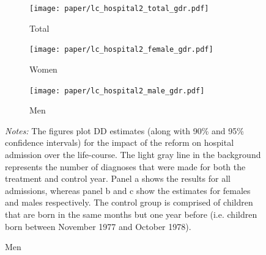 \documentclass[11pt, a4paper,draft]{article} %
\begin{document}





\newpage
\vspace*{\fill}
\begin{figure}[H]\centering
	\caption{Life-course approach}\label{fig: lc_hospital2_gdr_DD}
	\begin{subfigure}[h]{0.48\linewidth}\centering\caption{Total}
		\texttt{[image: paper/lc\_hospital2\_total\_gdr.pdf]}
	\end{subfigure}
	
	
	\begin{subfigure}[h]{0.48\linewidth}\centering\caption{Women}
		\texttt{[image: paper/lc\_hospital2\_female\_gdr.pdf]}
	\end{subfigure}
	\quad
	\begin{subfigure}[h]{0.48\linewidth}\centering\caption{Men}
		\texttt{[image: paper/lc\_hospital2\_male\_gdr.pdf]}
	\end{subfigure}
	\scriptsize
	\begin{minipage}{\linewidth}
		\emph{Notes:} The figures plot DD estimates (along with 90\% and 95\% confidence intervals) for the impact of the reform on hospital admission over the life-course. The light gray line in the background represents the number of diagnoses that were made for both the treatment and control year. Panel a shows the results for all admissions, whereas panel b and c show the estimates for females and males respectively. The control group is comprised of children	that are born in the same months but one year before (i.e. children born between November 1977 and October 1978).
	\end{minipage}
\end{figure}
\vspace*{\fill}\clearpage
\end{document}

